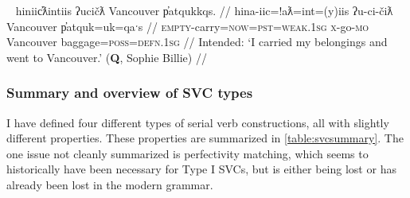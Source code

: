 \ex~ \label{ex:*packgo}
\begingl
\glpreamble *hiniic̓ƛintiis ʔucičƛ Vancouver p̓atqukkqs. //
\gla hina-iic=!aƛ=int=(y)iis ʔu-ci-čiƛ Vancouver p̓atquk=uk=qaˑs //
\glb \textsc{empty}-carry=\textsc{now}=\textsc{pst}=\textsc{weak.1sg} \textsc{x}-go-\textsc{mo} Vancouver baggage=\textsc{poss}=\textsc{defn.1sg} //
\glft Intended: `I carried my belongings and went to Vancouver.' (\textbf{Q}, Sophie Billie) //
\endgl
\xe


\begin{comment}
actions performed while changing locations (e.g., carry + go as in \ref{ex:carryluggage}),

\ex~ \label{ex:carryluggage}
\begingl
\glpreamble hiniic̓aƛna p̓atquk ʔucačiƛ Qualicum. //
\gla hina-iic=!aƛ=naˑ p̓atquk ʔu-ca-čiƛ Qualicum //
\glb \textsc{empty}-carry=\textsc{now}=\textsc{strg.1pl} belongings \textsc{x}-go.to-\textsc{mo} Qualicum //
\glft `We are taking our belongings going to Qualicum.' (\textbf{C}, \textit{tupaat} Julia Lucas) //
\endgl
\xe 
\end{comment}


\vspace{10pt}

\subsubsection{Summary and overview of SVC types} \label{ch:sv:data:summary}

\vspace{10pt}

I have defined four different types of serial verb constructions, all with slightly different properties. These properties are summarized in \cref{table:svcsummary}. The one issue not cleanly summarized is perfectivity matching, which seems to historically have been necessary for Type I SVCs, but is either being lost or has already been lost in the modern grammar.

